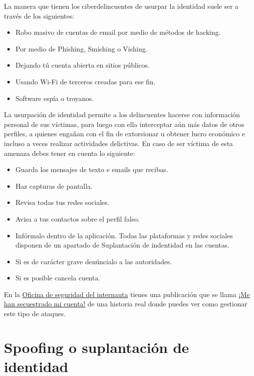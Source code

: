 \documentclass[
  spanish,
  a4paper,
  openany]{book}
\begin{document}
La manera que tienen los ciberdelincuentes de usurpar la identidad suele ser a través de los siguientes:

\begin{itemize}
\item
  Robo masivo de cuentas de email por medio de métodos de hacking.
\item
  Por medio de Phishing, Smishing o Vishing.
\item
  Dejando tú cuenta abierta en sitios públicos.
\item
  Usando Wi-Fi de terceros creadas para ese fin.
\item
  Software espía o troyanos.
\end{itemize}

La usurpación de identidad permite a los delincuentes hacerse con información personal de sus víctimas, para luego con ella interceptar aún más datos de otros perfiles, a quienes engañan con el fin de extorsionar u obtener lucro económico e incluso a veces realizar actividades delictivas.
En caso de ser víctima de esta amenaza debes tener en cuenta lo siguiente:

\begin{itemize}
\item
  Guarda los mensajes de texto e emails que recibas.
\item
  Haz capturas de pantalla.
\item
  Revisa todas tus redes sociales.
\item
  Avisa a tus contactos sobre el perfil falso.
\item
  Infórmalo dentro de la aplicación. Todas las plataformas y redes sociales disponen de un apartado de Suplantación de indentidad en las cuentas.
\item
  Si es de carácter grave denúncialo a las autoridades.
\item
  Si es posible cancela cuenta.
\end{itemize}

En la \href{https://www.osi.es/es}{Oficina de seguridad del internauta} tienes una publicación que se llama \href{https://www.osi.es/es/actualidad/historias-reales/2021/03/05/me-han-secuestrado-mi-cuenta}{¡Me han secuestrado mi cuenta!} de una historia real donde puedes ver como gestionar este tipo de ataques.

\hypertarget{spoofing-o-suplantaciuxf3n-de-identidad}{%
\section{Spoofing o suplantación de identidad}\label{spoofing-o-suplantaciuxf3n-de-identidad}}
\end{document}
